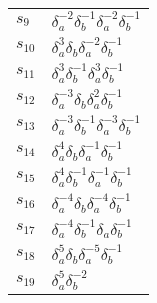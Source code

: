 \documentclass{article}
\begin{document}
\begin{center}
\begin{tabular}{ll}
$s_{9}$ & $\delta_a^{-2}\delta_b^{-1}\delta_a^{-2}\delta_b^{-1}$ \\
$s_{10}$ & $\delta_a^{3}\delta_b^{}\delta_a^{-2}\delta_b^{-1}$ \\
$s_{11}$ & $\delta_a^{3}\delta_b^{-1}\delta_a^{3}\delta_b^{-1}$ \\
$s_{12}$ & $\delta_a^{-3}\delta_b^{}\delta_a^{2}\delta_b^{-1}$ \\
$s_{13}$ & $\delta_a^{-3}\delta_b^{-1}\delta_a^{-3}\delta_b^{-1}$ \\
$s_{14}$ & $\delta_a^{4}\delta_b^{}\delta_a^{-1}\delta_b^{-1}$ \\
$s_{15}$ & $\delta_a^{4}\delta_b^{-1}\delta_a^{-1}\delta_b^{-1}$ \\
$s_{16}$ & $\delta_a^{-4}\delta_b^{}\delta_a^{-4}\delta_b^{-1}$ \\
$s_{17}$ & $\delta_a^{-4}\delta_b^{-1}\delta_a^{}\delta_b^{-1}$ \\
$s_{18}$ & $\delta_a^{5}\delta_b^{}\delta_a^{-5}\delta_b^{-1}$ \\
$s_{19}$ & $\delta_a^{5}\delta_b^{-2}$ \\
\bottomrule
\end{tabular}
\end{center}

\thispagestyle{empty}
\end{document}

